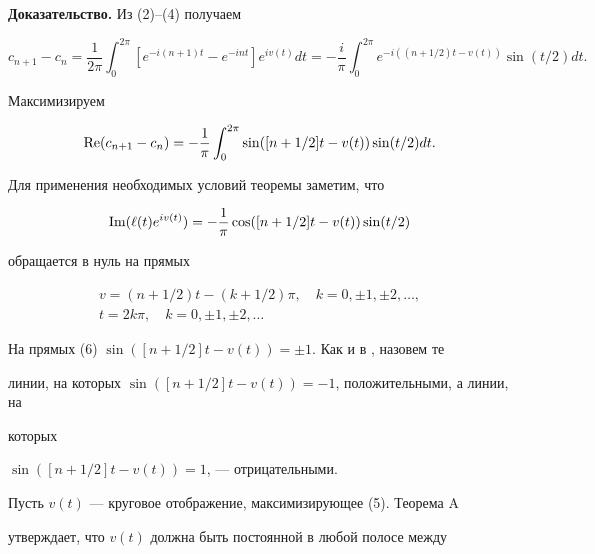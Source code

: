  


{\bf Доказательство.} Из (2)--(4) получаем 


$$ 


c_{n+1}-c_n=\frac{1}{2\pi}\int^{2\pi}_0 [e^{-i(n+1)t}- 


e^{-int}]e^{iv(t)}dt=-\frac{i}{\pi}\int^{2\pi}_0 


e^{-i((n+1/2)t-v(t))}\sin(t/2)dt. 


$$ 


Максимизируем 


\begin{equation} 


\re(c_{n+1}-c_n)=-\frac{1}{\pi}\int^{2\pi}_0 


\sin([n+1/2]t-v(t))\sin(t/2)dt. 


\end{equation} 


 


Для применения необходимых условий теоремы заметим, что 


$$ 


\im(\ell(t)e^{iv(t)})=-\frac{1}{\pi}\cos 


([n+1/2]t-v(t))\sin(t/2) 


$$ 


обращается в нуль на прямых 


\begin{equation} 


\begin{array}{c} 


v=(n+1/2)t-(k+1/2)\pi,\quad k=0,\pm1,\pm2,\dotsc,\\ 


t=2k\pi,\quad k=0,\pm1,\pm2,\dotsc 


\end{array} 


\end{equation} 


На прямых (6) $\sin([n+1/2]t-v(t))=\pm1$. Как и в \cite{1}, назовем те 


линии, на которых $\sin([n+1/2]t-v(t))=-1$, положительными, а линии, на 


которых 


$\sin([n+1/2]t-v(t))=1$, --- отрицательными. 


 


Пусть $v(t)$ --- круговое отображение, максимизирующее (5). Теорема A 


утверждает, что $v(t)$ должна быть постоянной в любой полосе между 


